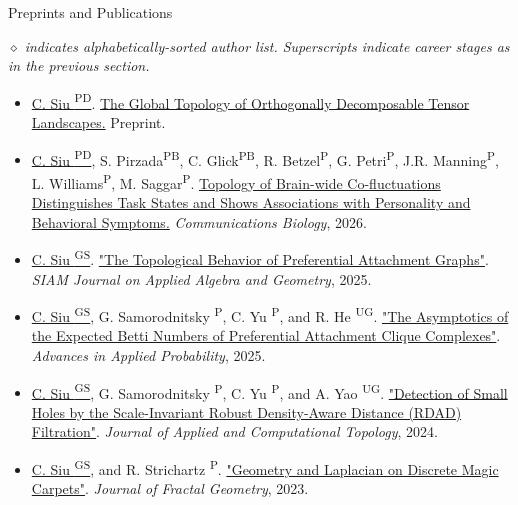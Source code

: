 \documentclass{resume} %
\begin{document}
\begin{rSection}{Preprints and Publications}

\emph{$\diamond$ indicates alphabetically-sorted author list. Superscripts indicate career stages as in the previous section.}

\begin{itemize}[noitemsep]
\item \underline{C. Siu {\textsuperscript{PD}}}. \href{https://arxiv.org/abs/2609.14186}{The Global Topology of Orthogonally Decomposable Tensor
Landscapes.} Preprint.
	\item \underline{C. Siu {\textsuperscript{PD}}}, S. Pirzada\textsuperscript{PB}, C. Glick\textsuperscript{PB}, R. Betzel\textsuperscript{P}, G. Petri\textsuperscript{P}, J.R. Manning\textsuperscript{P}, L. Williams\textsuperscript{P}, M. Saggar\textsuperscript{P}. \href{https://www.nature.com/articles/s42003-026-11292-8}{Topology of Brain-wide Co-fluctuations Distinguishes Task States and Shows Associations with Personality and Behavioral Symptoms.} \emph{Communications Biology}, 2026.
    \item \underline{C. Siu {\textsuperscript{GS}}}. \href{https://epubs.siam.org/doi/10.1137/24M1693179}{"The Topological Behavior of Preferential Attachment Graphs"}. \emph{SIAM Journal on Applied Algebra and Geometry}, 2025.

    \item \underline{C. Siu {\textsuperscript{GS}}}, G. Samorodnitsky \textsuperscript{P}, C. Yu \textsuperscript{P}, and R. He \textsuperscript{UG}. \href{https://www.cambridge.org/core/journals/advances-in-applied-probability/article/asymptotics-of-the-expected-betti-numbers-of-preferential-attachment-clique-complexes/5A7074FC4F88DFDD609655A80B26C055}{"The Asymptotics of the Expected Betti Numbers of Preferential Attachment Clique Complexes"}. \emph{Advances in Applied Probability}, 2025.
    
    \item \underline{C. Siu {\textsuperscript{GS}}}, G. Samorodnitsky \textsuperscript{P}, C. Yu \textsuperscript{P}, and A. Yao \textsuperscript{UG}. \href{https://rdcu.be/dCXLa}{"Detection of Small Holes by the Scale-Invariant Robust Density-Aware Distance (RDAD) Filtration"}. \emph{Journal of Applied and Computational Topology}, 2024.
    
    \item[$\diamond$] \underline{C. Siu {\textsuperscript{GS}}}, and R. Strichartz \textsuperscript{P}. \href{https://ems.press/journals/jfg/articles/10964400}{"Geometry and Laplacian on Discrete Magic Carpets"}. \emph{Journal of Fractal Geometry}, 2023.
    

\end{itemize}
\end{rSection}
\end{document}
